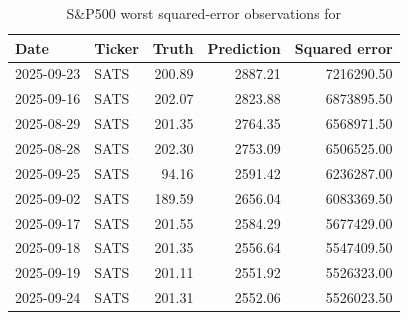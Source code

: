 
\begin{table}[H]
\centering
\caption{S\&P500 worst squared-error observations for }
\label{tab:wst-har-q}
\scriptsize
\begin{tabular}{llrrr}
\toprule
Date & Ticker & Truth & Prediction & Squared error \\
\midrule
2025-09-23 & SATS & 200.89 & 2887.21 & 7216290.50 \\
2025-09-16 & SATS & 202.07 & 2823.88 & 6873895.50 \\
2025-08-29 & SATS & 201.35 & 2764.35 & 6568971.50 \\
2025-08-28 & SATS & 202.30 & 2753.09 & 6506525.00 \\
2025-09-25 & SATS & 94.16 & 2591.42 & 6236287.00 \\
2025-09-02 & SATS & 189.59 & 2656.04 & 6083369.50 \\
2025-09-17 & SATS & 201.55 & 2584.29 & 5677429.00 \\
2025-09-18 & SATS & 201.35 & 2556.64 & 5547409.50 \\
2025-09-19 & SATS & 201.11 & 2551.92 & 5526323.00 \\
2025-09-24 & SATS & 201.31 & 2552.06 & 5526023.50 \\

\bottomrule
\end{tabular}
\end{table}
